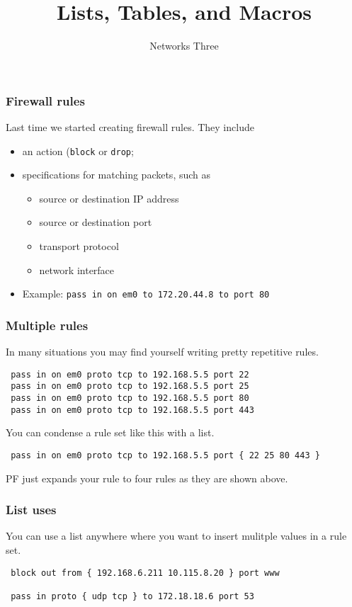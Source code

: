 \documentclass[10pt]{beamer}
\title{Lists, Tables, and  Macros}
\author[IN715]{Networks Three}
\institute[Otago Polytechnic]{
  Otago Polytechnic \\
  Dunedin, New Zealand \\
}
\date{}
\begin{document}
\begin{frame}[plain]
  \titlepage
\end{frame}


\begin{frame}
  \frametitle{Firewall rules}
 Last time we started creating firewall rules. They include
 \begin{itemize}
    \item an action (\texttt{block} or \texttt{drop};
    \item specifications for matching packets, such as
        \begin{itemize}
             \item source or destination IP address
             \item source or destination port
             \item transport protocol
             \item network interface
        \end{itemize}
    \item Example: \texttt{pass in on em0 to 172.20.44.8 to port 80} 
 \end{itemize}

\end{frame}


\begin{frame}[fragile]
  \frametitle{Multiple rules}

 In many situations you may find yourself writing pretty repetitive rules.

 \begin{verbatim}
 pass in on em0 proto tcp to 192.168.5.5 port 22    
 pass in on em0 proto tcp to 192.168.5.5 port 25    
 pass in on em0 proto tcp to 192.168.5.5 port 80    
 pass in on em0 proto tcp to 192.168.5.5 port 443   
 \end{verbatim}
 
 You can condense a rule set like this with a list.
 \begin{verbatim}
 pass in on em0 proto tcp to 192.168.5.5 port { 22 25 80 443 }   
 \end{verbatim}
 PF just expands your rule to four rules as they are shown above.
\end{frame}



\begin{frame}[fragile]
  \frametitle{List uses}

 You can use a list anywhere where you want to insert mulitple values in a 
 rule set.

 \begin{verbatim}
 block out from { 192.168.6.211 10.115.8.20 } port www

 pass in proto { udp tcp } to 172.18.18.6 port 53   
 \end{verbatim}

\end{frame}
\end{document}
